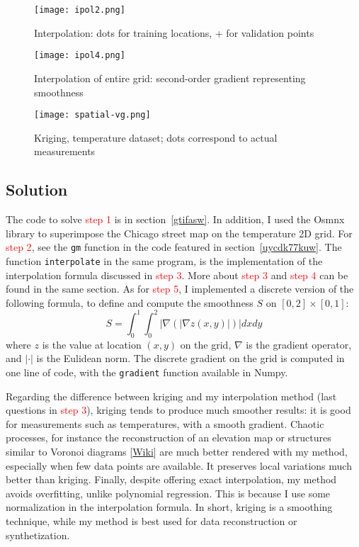 \documentclass[oneside,10pt]{book}
\begin{document}
\begin{figure}%
\centering
\texttt{[image: ipol2.png]}   
\caption{Interpolation: dots for training locations, + for validation points}
\label{fig:gretelbwacxzaf}
\end{figure}

\begin{figure}%
\centering
\texttt{[image: ipol4.png]}   
\caption{Interpolation of entire grid: second-order gradient representing smoothness}
\label{fig:gretelbwacxag}
\end{figure}

\begin{figure}%
\centering
\texttt{[image: spatial-vg.png]}   
\caption{Kriging, temperature dataset; dots correspond to actual measurements}
\label{fig:gretelbwacxah}
\end{figure}



\subsection{Solution}

The code to solve \textcolor{red}{step 1} is in section~\ref{gtifasw}. In addition, I used the Osmnx library to superimpose the Chicago
 street map on the temperature 2D grid. For \textcolor{red}{step 2}, see the \texttt{gm} function in the code featured
 in section~\ref{uycdk77kuw}. The function \texttt{interpolate} in the same program, is the implementation
 of the interpolation formula discussed in \textcolor{red}{step 3}. More about \textcolor{red}{step 3} and 
\textcolor{red}{step 4} can be found in the same section. As for \textcolor{red}{step 5}, I implemented a discrete version of the following formula, to define and compute the smoothness $S$ on $[0, 2]\times [0, 1]$:
$$
S = \int_{0}^1\int_{0}^2 |\nabla (\lvert\nabla z(x,y)\rvert)| dx dy
$$
where $z$ is the value at location $(x, y)$ on the grid, $\nabla$ is the gradient operator, and $|\cdot|$ is the Eulidean norm. The discrete gradient on the grid is computed in one line of code,
 with the \texttt{gradient} function available in Numpy.

Regarding the difference between kriging and my interpolation method (last
 questions in \textcolor{red}{step 3}), kriging tends to produce much smoother results:
 it is good for measurements such as temperatures, with a smooth gradient. Chaotic processes, for instance the reconstruction of an elevation map or structures similar to \textcolor{index}{Voronoi diagrams} [\href{https://en.wikipedia.org/wiki/Voronoi_diagram}{Wiki}] are much better rendered with my method, especially when few data points are available. It preserves local variations much better than kriging. Finally, despite offering exact interpolation, my method avoids overfitting, unlike
 polynomial regression. This is because I use some normalization in the interpolation formula.
 In short, kriging is a smoothing technique, while my method is best used for data
 reconstruction or synthetization.
\end{document}
